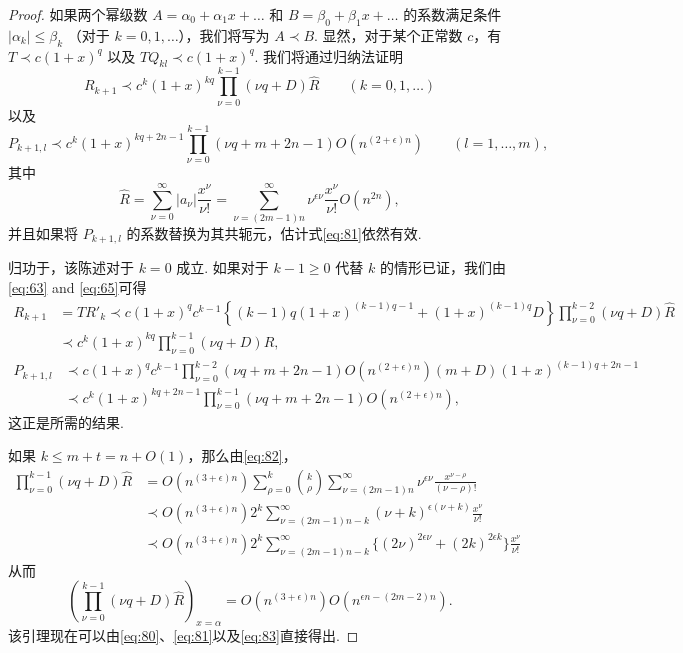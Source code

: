 \begin{proof}
如果两个幂级数 $A=\alpha_0+\alpha_1x+\dots$ 和 $B=\beta_0+\beta_1x+\dots$ 的系数满足条件 $|\alpha_k| \le \beta_k$ （对于 $k=0,1,\dots$），我们将写为 $A \prec B$. 显然，对于某个正常数 $c$，有 $T \prec c(1+x)^q$ 以及 $T Q_{kl} \prec c(1+x)^q$. 我们将通过归纳法证明
\begin{equation}
R_{k+1} \prec c^k (1+x)^{kq} \prod_{\nu=0}^{k-1} (\nu q + D) \hat{R} \qquad (k=0,1,\dots) \tag{80}\label{eq:80}
\end{equation}
以及
\begin{equation}
P_{k+1,l} \prec c^{k} (1+x)^{kq+2n-1} \prod_{\nu=0}^{k-1} (\nu q + m + 2n-1) O(n^{(2+\epsilon)n}) \qquad (l=1,\dots,m), \tag{81}\label{eq:81}
\end{equation}
其中
\begin{equation}
\hat{R} = \sum_{\nu=0}^{\infty} |a_{\nu}| \frac{x^{\nu}}{\nu!} = \sum_{\nu=(2m-1)n}^{\infty} \nu^{\epsilon \nu} \frac{x^{\nu}}{\nu!} O(n^{2n}), \tag{82}\label{eq:82}
\end{equation}
并且如果将 $P_{k+1,l}$ 的系数替换为其共轭元，估计式\eqref{eq:81}依然有效.

归功于，该陈述对于 $k=0$ 成立. 如果对于 $k-1 \ge 0$ 代替 $k$ 的情形已证，我们由\eqref{eq:63} and \eqref{eq:65}可得
\[
\begin{aligned}
R_{k+1} &= T R'_{k} \prec c(1+x)^{q} c^{k-1} \left\{ (k-1)q(1+x)^{(k-1)q-1} + (1+x)^{(k-1)q}D \right\} \prod_{\nu=0}^{k-2} (\nu q+D) \hat{R} \\
&\prec c^{k} (1+x)^{kq} \prod_{\nu=0}^{k-1} (\nu q+D) \hat{R},
\end{aligned}
\]
\[
\begin{aligned}
P_{k+1,l} &\prec c(1+x)^{q} c^{k-1} \prod_{\nu=0}^{k-2} (\nu q + m + 2n - 1) O(n^{(2+\epsilon)n}) (m+D)(1+x)^{(k-1)q+2n-1} \\
&\prec c^k (1+x)^{kq+2n-1} \prod_{\nu=0}^{k-1} (\nu q + m + 2n-1) O(n^{(2+\epsilon)n}),
\end{aligned}
\]
这正是所需的结果.

如果 $k \le m+t = n+O(1)$，那么由\eqref{eq:82}，
\[
\begin{aligned}
\prod_{\nu=0}^{k-1} (\nu q + D) \hat{R} &= O(n^{(3+\epsilon)n}) \sum_{\rho=0}^{k} \binom{k}{\rho} \sum_{\nu=(2m-1)n}^{\infty} \nu^{\epsilon\nu} \frac{x^{\nu-\rho}}{(\nu-\rho)!} \\
&\prec O(n^{(3+\epsilon)n}) 2^{k} \sum_{\nu=(2m-1)n-k}^{\infty} (\nu+k)^{\epsilon(\nu+k)} \frac{x^{\nu}}{\nu!} \\
&\prec O(n^{(3+\epsilon)n}) 2^{k} \sum_{\nu=(2m-1)n-k}^{\infty} \{(2\nu)^{2\epsilon\nu} + (2k)^{2\epsilon k}\} \frac{x^{\nu}}{\nu!}
\end{aligned}
\]
从而
\begin{equation}
\left( \prod_{\nu=0}^{k-1} (\nu q + D) \hat{R} \right)_{x=\alpha} = O(n^{(3+\epsilon)n}) O(n^{\epsilon n - (2m-2)n}). \tag{83}\label{eq:83}
\end{equation}
该引理现在可以由\eqref{eq:80}、\eqref{eq:81}以及\eqref{eq:83}直接得出.
\end{proof}

